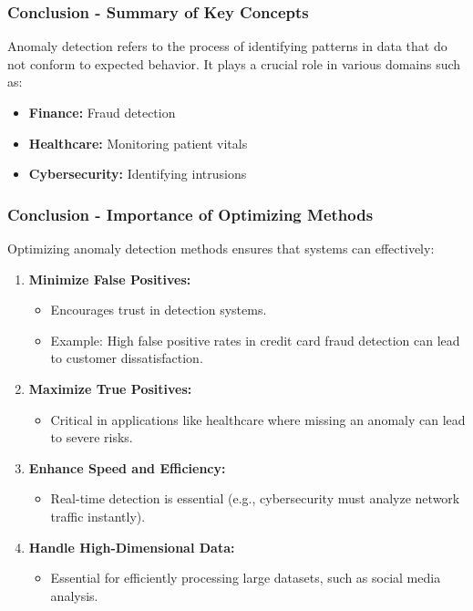 \documentclass{beamer}
\begin{document}
\begin{frame}[fragile]
    \frametitle{Conclusion - Summary of Key Concepts}
    Anomaly detection refers to the process of identifying patterns in data that do not conform to expected behavior. It plays a crucial role in various domains such as:
    \begin{itemize}
        \item \textbf{Finance:} Fraud detection
        \item \textbf{Healthcare:} Monitoring patient vitals
        \item \textbf{Cybersecurity:} Identifying intrusions
    \end{itemize}
\end{frame}

\begin{frame}[fragile]
    \frametitle{Conclusion - Importance of Optimizing Methods}
    Optimizing anomaly detection methods ensures that systems can effectively:
    \begin{enumerate}
        \item \textbf{Minimize False Positives:}
            \begin{itemize}
                \item Encourages trust in detection systems.
                \item Example: High false positive rates in credit card fraud detection can lead to customer dissatisfaction.
            \end{itemize}
        \item \textbf{Maximize True Positives:}
            \begin{itemize}
                \item Critical in applications like healthcare where missing an anomaly can lead to severe risks.
            \end{itemize}
        \item \textbf{Enhance Speed and Efficiency:}
            \begin{itemize}
                \item Real-time detection is essential (e.g., cybersecurity must analyze network traffic instantly).
            \end{itemize}
        \item \textbf{Handle High-Dimensional Data:}
            \begin{itemize}
                \item Essential for efficiently processing large datasets, such as social media analysis.
            \end{itemize}
    \end{enumerate}
\end{frame}
\end{document}
